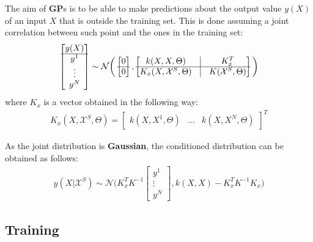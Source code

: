 \documentclass{article}
\begin{document}
The aim of \textbf{GP}s is to be able to make predictions about the output value $y(X)$ of an input $X$ that is outside the training set. This is done assuming a joint correlation between such point and the ones in the training set: 
\begin{eqnarray}
\begin{bmatrix} y(X) \\ \hline y^1 \\ \vdots \\ y^N \end{bmatrix} \sim \mathcal{N} 
\bigg (
\begin{bmatrix} 0 \\ \hline 0 \end{bmatrix},
\begin{bmatrix}
k(X,X, \Theta) & \vline & K_x^T \\ 
\hline
K_x(X, \mathcal{X}^S, \Theta) & \vline & K(\mathcal{X}^S, \Theta)
\end{bmatrix}
\bigg )
\end{eqnarray}
where $K_x$ is a vector obtained in the following way:
\begin{eqnarray}
K_x(X, \mathcal{X}^S, \Theta) = \begin{bmatrix}
k(X, X^1 , \Theta) & \hdots & k(X, X^N , \Theta)
\end{bmatrix} ^ T
\end{eqnarray}

As the joint distribution is \textbf{Gaussian}, the conditioned distribution can be obtained as follows:
\begin{eqnarray}
y(X | \mathcal{X}^S) \sim \mathcal{N} \bigg ( 
K_x^T K^{-1} \begin{bmatrix} y^1 \\ \vdots \\ y^N \end{bmatrix} , 
k(X,X) - K_x^T K^{-1}K_x
\bigg )
\end{eqnarray}

\subsection{Training}
\label{sec:train_scalar}
\end{document}
